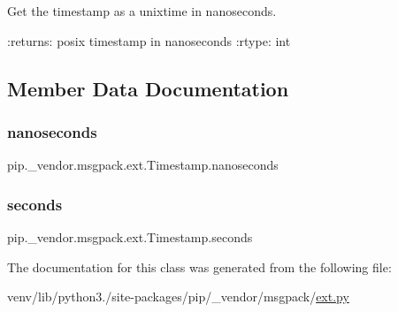 \begin{DoxyVerb}Get the timestamp as a unixtime in nanoseconds.

:returns: posix timestamp in nanoseconds
:rtype: int
\end{DoxyVerb}
 

\subsection{Member Data Documentation}
\mbox{\label{classpip_1_1__vendor_1_1msgpack_1_1ext_1_1Timestamp_a6445f24723dbb45fb5f6f7e527acf222}} 
\subsubsection{\texorpdfstring{nanoseconds}{nanoseconds}}
{\footnotesize\ttfamily pip.\+\_\+vendor.\+msgpack.\+ext.\+Timestamp.\+nanoseconds}

\mbox{\label{classpip_1_1__vendor_1_1msgpack_1_1ext_1_1Timestamp_a402dde70e5dd6bfc4d783bb780a00c8f}} 
\subsubsection{\texorpdfstring{seconds}{seconds}}
{\footnotesize\ttfamily pip.\+\_\+vendor.\+msgpack.\+ext.\+Timestamp.\+seconds}



The documentation for this class was generated from the following file\+:\begin{DoxyCompactItemize}
\item 
venv/lib/python3./site-\/packages/pip/\+\_\+vendor/msgpack/\hyperlink{ext_8py}{ext.\+py}\end{DoxyCompactItemize}
